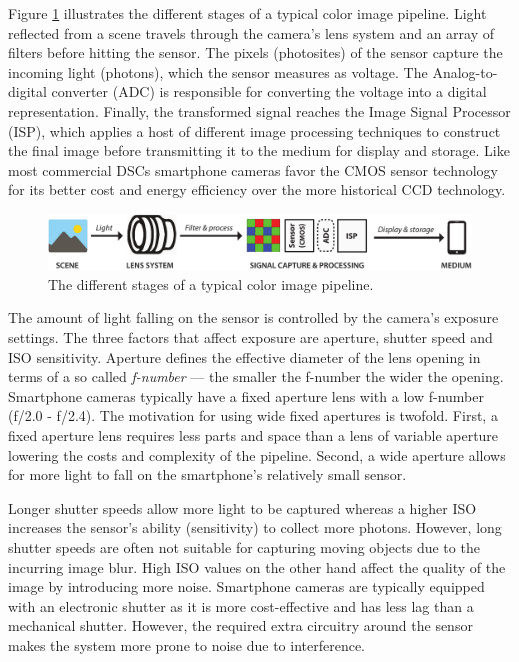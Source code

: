 \documentclass[thesis.tex]{subfiles}
\begin{document}
Figure \ref{figure:pipeline} illustrates the different stages of a typical color image pipeline. Light reflected from a scene travels through the camera's lens system and an array of filters before hitting the sensor. The pixels (photosites) of the sensor capture the incoming light (photons), which the sensor measures as voltage. The Analog-to-digital converter (ADC) is responsible for converting the voltage into a digital representation. Finally, the transformed signal reaches the Image Signal Processor (ISP), which applies a host of different image processing techniques to construct the final image before transmitting it to the medium for display and storage. Like most commercial DSCs smartphone cameras favor the CMOS sensor technology for its better cost and energy efficiency over the more historical CCD technology.

\begin{figure}[h]
\centering \includegraphics[width=\textwidth]{images/pipeline}
\caption{The different stages of a typical color image pipeline.\label{figure:pipeline}}
\end{figure}

The amount of light falling on the sensor is controlled by the camera's exposure settings. The three factors that affect exposure are aperture, shutter speed and ISO sensitivity. Aperture defines the effective diameter of the lens opening in terms of a so called \textit{f-number} --- the smaller the f-number the wider the opening. Smartphone cameras typically have a fixed aperture lens with a low f-number (f/2.0 - f/2.4). The motivation for using wide fixed apertures is twofold. First, a fixed aperture lens requires less parts and space than a lens of variable aperture lowering the costs and complexity of the pipeline. Second, a wide aperture allows for more light to fall on the smartphone's relatively small sensor.

Longer shutter speeds allow more light to be captured whereas a higher ISO increases the sensor's ability (sensitivity) to collect more photons. However, long shutter speeds are often not suitable for capturing moving objects due to the incurring image blur. High ISO values on the other hand affect the quality of the image by introducing more noise. Smartphone cameras are typically equipped with an electronic shutter as it is more cost-effective and has less lag than a mechanical shutter. However, the required extra circuitry around the sensor makes the system more prone to noise due to interference.
\end{document}
